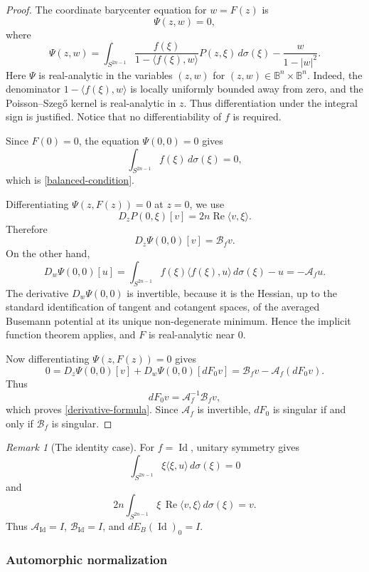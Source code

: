 \documentclass[11pt]{article}
\theoremstyle{definition}
\theoremstyle{remark}
\newtheorem{remark}[theorem]{Remark}
\theoremstyle{definition}
\newcommand{\B}{\mathbb B}
\newcommand{\Id}{\operatorname{Id}}
\newcommand{\Real}{\operatorname{Re}}
\begin{document}
\begin{proof}
The coordinate barycenter equation for \(w=F(z)\) is
\[
        \Psi(z,w)=0,
\]
where
\[
        \Psi(z,w)=
        \int_{S^{2n-1}}
        \frac{f(\xi)}{1-\langle f(\xi),w\rangle}
        P(z,\xi)\,d\sigma(\xi)
        -
        \frac{w}{1-|w|^2}.
\]
Here \(\Psi\) is real-analytic in the variables \((z,w)\) for
\((z,w)\in\B^n\times\B^n\). Indeed, the denominator
\(1-\langle f(\xi),w\rangle\) is locally uniformly bounded away from zero,
and the Poisson--Szeg\H{o} kernel is real-analytic in \(z\). Thus
differentiation under the integral sign is justified. Notice that no
differentiability of \(f\) is required.

Since \(F(0)=0\), the equation \(\Psi(0,0)=0\) gives
\[
        \int_{S^{2n-1}} f(\xi)\,d\sigma(\xi)=0,
\]
which is \eqref{balanced-condition}.

Differentiating \(\Psi(z,F(z))=0\) at \(z=0\), we use
\[
        D_zP(0,\xi)[v]=2n\Real\langle v,\xi\rangle.
\]
Therefore
\[
        D_z\Psi(0,0)[v]=\mathcal B_fv.
\]
On the other hand,
\[
        D_w\Psi(0,0)[u]
        =
        \int_{S^{2n-1}}
        f(\xi)\langle f(\xi),u\rangle\,d\sigma(\xi)-u
        =
        -\mathcal A_fu.
\]
The derivative \(D_w\Psi(0,0)\) is invertible, because it is the Hessian,
up to the standard identification of tangent and cotangent spaces, of the
averaged Busemann potential at its unique non-degenerate minimum. Hence the
implicit function theorem applies, and \(F\) is real-analytic near \(0\).

Now differentiating \(\Psi(z,F(z))=0\) gives
\[
        0
        =
        D_z\Psi(0,0)[v]
        +
        D_w\Psi(0,0)[dF_0v]
        =
        \mathcal B_fv-\mathcal A_f(dF_0v).
\]
Thus
\[
        dF_0v=\mathcal A_f^{-1}\mathcal B_fv,
\]
which proves \eqref{derivative-formula}. Since \(\mathcal A_f\) is invertible,
\(dF_0\) is singular if and only if \(\mathcal B_f\) is singular.
\end{proof}

\begin{remark}[The identity case]
For \(f=\Id\), unitary symmetry gives
\[
        \int_{S^{2n-1}}\xi\langle \xi,u\rangle\,d\sigma(\xi)=0
\]
and
\[
        2n\int_{S^{2n-1}}\xi\,\Real\langle v,\xi\rangle\,d\sigma(\xi)=v.
\]
Thus \(\mathcal A_{\Id}=I\), \(\mathcal B_{\Id}=I\), and
\(dE_B(\Id)_0=I\).
\end{remark}


\subsubsection{Automorphic normalization}
\label{section-automorphic-estimates}
\end{document}
